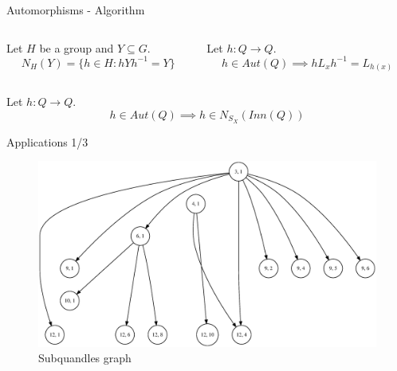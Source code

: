 \begin{frame}{Automorphisms - Algorithm}
\normalsize
\begin{columns}
\begin{column}{0.45\textwidth}
\begin{definition}

Let $H$ be a group and $Y \subseteq G$.\newline
\[N_H(Y) = \{ h \in H : hYh^{-1} = Y\}\]
\end{definition}

\end{column}
\begin{column}{0.5\textwidth}

\begin{lemma}
Let $h : Q \to Q$.
\[h \in Aut(Q) \implies hL_xh^{-1} = L_{h(x)}\]
\end{lemma}
\end{column}
\end{columns}
\begin{center}
\begin{theorem}
Let $h : Q \to Q$.
\[h \in Aut(Q) \implies h \in N_{S_X}(Inn(Q))\]
\end{theorem}
    \textcolor{darkred}{} 
\end{center}
\end{frame}

\begin{frame}{Applications 1/3}
\begin{figure}[H]
    \centering
    \includegraphics[scale = 0.3]{Thesis/images/SubQuandle1.eps}
    \caption{Subquandles graph}
    \label{fig:my_label}
\end{figure}
\end{frame}

